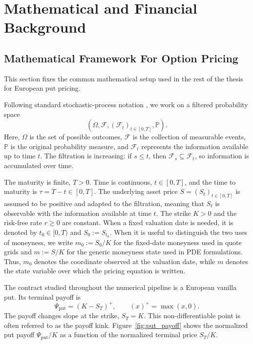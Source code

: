 \chapter{Mathematical and Financial Background}
\label{ch:background}

\section{Mathematical Framework For Option Pricing}
This section fixes the common mathematical setup used in the rest of the thesis for European put pricing.

Following standard stochastic-process notation \cite[Ch.~1]{oksendal2003}, we work on a filtered probability space
\[
(\Omega,\mathcal F,(\mathcal F_t)_{t\in[0,T]},\mathbb P).
\]
Here, $\Omega$ is the set of possible outcomes, $\mathcal F$ is the collection of measurable events, $\mathbb P$ is the original probability measure, and $\mathcal F_t$ represents the information available up to time $t$. The filtration is increasing: if $s\leq t$, then $\mathcal F_s\subseteq\mathcal F_t$, so information is accumulated over time.

The maturity is finite, $T>0$.
Time is continuous, $t\in[0,T]$, and the time to maturity is $\tau=T-t\in[0,T]$.
The underlying asset price $S=(S_t)_{t\in[0,T]}$ is assumed to be positive and adapted to the filtration, meaning that $S_t$ is observable with the information available at time $t$.
The strike $K>0$ and the risk-free rate $r\geq0$ are constant.
When a fixed valuation date is needed, it is denoted by $t_0\in[0,T)$ and $S_0:=S_{t_0}$.
When it is useful to distinguish the two uses of moneyness, we write $m_0:=S_0/K$ for the fixed-date moneyness used in quote grids and $m:=S/K$ for the generic moneyness state used in PDE formulations. Thus, $m_0$ denotes the coordinate observed at the valuation date, while $m$ denotes the state variable over which the pricing equation is written.

The contract studied throughout the numerical pipeline is a European vanilla put.
Its terminal payoff is
\begin{equation}
    \label{eq:european_put_payoff}
    \Psi_{\mathrm{put}}=(K-S_T)^+,\qquad (x)^+=\max(x,0).
\end{equation}
The payoff changes slope at the strike, $S_T=K$. This non-differentiable point is often referred to as the payoff kink.
Figure~\ref{fig:put_payoff} shows the normalized put payoff $\Psi_{\mathrm{put}}/K$ as a function of the normalized terminal price $S_T/K$.

